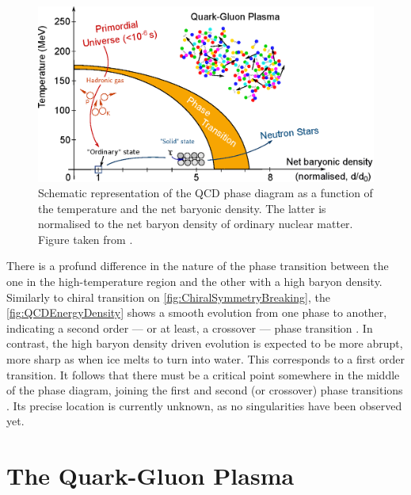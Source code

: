 \begin{figure}[h]
	\centering
	\includegraphics[width=\textwidth]{Figs/Chapter2/DiagrPhase.eps}
	\caption{Schematic representation of the QCD phase diagram as a function of the temperature and the net baryonic density. The latter is normalised to the net baryon density of ordinary nuclear matter. Figure taken from \cite{mairePhaseDiagramQCD2015}.}
	\label{fig:QCDPhaseDiagram}
\end{figure}

There is a profund difference in the nature of the phase transition between the one in the high-temperature region and the other with a high baryon density. Similarly to chiral transition on \fig\ref{fig:ChiralSymmetryBreaking}, the \fig\ref{fig:QCDEnergyDensity} shows a smooth evolution from one phase to another, indicating a second order --- or at least, a crossover --- phase transition \cite{philipsenQCDEquationState2013}. In contrast, the high baryon density driven evolution is expected to be more abrupt, more sharp as when ice melts to turn into water. This corresponds to a first order transition. It follows that there must be a critical point somewhere in the middle of the phase diagram, joining the first and second (or crossover) phase transitions \cite{stephanovQCDPhaseDiagram2005}. Its precise location is currently unknown, as no singularities have been observed yet.


\section{The Quark-Gluon Plasma}
\label{sec:QGP}

